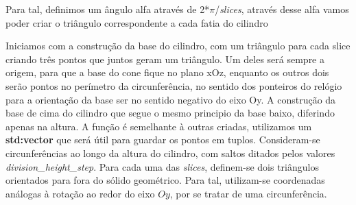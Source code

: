 \documentclass[14pt, a4 paper]{report}
\begin{document}
Para tal, definimos um ângulo alfa através de 2*$\pi$/\textit{slices}, através desse alfa vamos poder criar o triângulo correspondente a cada fatia do cilindro

Iniciamos com a construção da base do cilindro, com um triângulo para cada slice criando três pontos que juntos geram
um triângulo. Um deles será sempre a origem, para que a base do cone fique no plano xOz, enquanto os outros dois
serão pontos no perímetro da circunferência, no sentido dos ponteiros do relógio para a orientação da base ser no sentido negativo do eixo Oy.
A construção da base de cima do cilindro que segue o mesmo principio da base baixo, diferindo apenas na altura.
A função é semelhante à outras criadas, utilizamos um \textbf{std:vector} que será útil para guardar os pontos em tuplos.
Consideram-se circunferências ao longo da altura do cilindro, com saltos ditados pelos valores \textit{division\_height\_step}. Para cada uma das \textit{slices}, definem-se dois triângulos orientados para fora do sólido geométrico. Para tal, utilizam-se coordenadas análogas à rotação ao redor do eixo $Oy$, por se tratar de uma circunferência.
\end{document}
